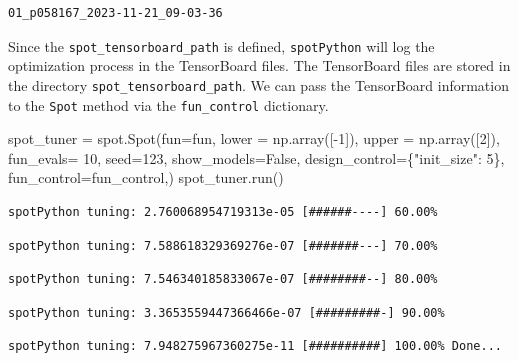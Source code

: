 \documentclass[
  letterpaper,
  DIV=11,
  numbers=noendperiod]{scrreprt}
\newenvironment{Shaded}{\begin{snugshade}}{\end{snugshade}}
\newcommand{\DecValTok}[1]{\textcolor[rgb]{0.68,0.00,0.00}{#1}}
\newcommand{\NormalTok}[1]{\textcolor[rgb]{0.00,0.23,0.31}{#1}}
\newcommand{\OperatorTok}[1]{\textcolor[rgb]{0.37,0.37,0.37}{#1}}
\newcommand{\StringTok}[1]{\textcolor[rgb]{0.13,0.47,0.30}{#1}}
\newcommand{\VariableTok}[1]{\textcolor[rgb]{0.07,0.07,0.07}{#1}}
\begin{document}
\begin{verbatim}
01_p058167_2023-11-21_09-03-36
\end{verbatim}

Since the \texttt{spot\_tensorboard\_path} is defined,
\texttt{spotPython} will log the optimization process in the TensorBoard
files. The TensorBoard files are stored in the directory
\texttt{spot\_tensorboard\_path}. We can pass the TensorBoard
information to the \texttt{Spot} method via the \texttt{fun\_control}
dictionary.

\begin{Shaded}
\begin{Highlighting}[]
\NormalTok{spot\_tuner }\OperatorTok{=}\NormalTok{ spot.Spot(fun}\OperatorTok{=}\NormalTok{fun,}
\NormalTok{                   lower }\OperatorTok{=}\NormalTok{ np.array([}\OperatorTok{{-}}\DecValTok{1}\NormalTok{]),}
\NormalTok{                   upper }\OperatorTok{=}\NormalTok{ np.array([}\DecValTok{2}\NormalTok{]),}
\NormalTok{                   fun\_evals}\OperatorTok{=} \DecValTok{10}\NormalTok{,}
\NormalTok{                   seed}\OperatorTok{=}\DecValTok{123}\NormalTok{,}
\NormalTok{                   show\_models}\OperatorTok{=}\VariableTok{False}\NormalTok{,}
\NormalTok{                   design\_control}\OperatorTok{=}\NormalTok{\{}\StringTok{"init\_size"}\NormalTok{: }\DecValTok{5}\NormalTok{\},}
\NormalTok{                   fun\_control}\OperatorTok{=}\NormalTok{fun\_control,)}
\NormalTok{spot\_tuner.run()}
\end{Highlighting}
\end{Shaded}

\begin{verbatim}
spotPython tuning: 2.760068954719313e-05 [######----] 60.00% 
\end{verbatim}

\begin{verbatim}
spotPython tuning: 7.588618329369276e-07 [#######---] 70.00% 
\end{verbatim}

\begin{verbatim}
spotPython tuning: 7.546340185833067e-07 [########--] 80.00% 
\end{verbatim}

\begin{verbatim}
spotPython tuning: 3.3653559447366466e-07 [#########-] 90.00% 
\end{verbatim}

\begin{verbatim}
spotPython tuning: 7.948275967360275e-11 [##########] 100.00% Done...
\end{verbatim}
\end{document}
